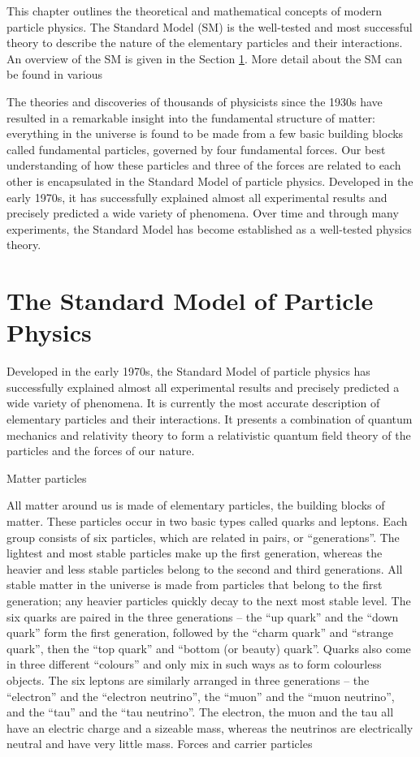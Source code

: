 This chapter outlines the theoretical and mathematical concepts of modern particle physics.
The Standard Model (SM) is the well-tested and most successful theory to describe the nature of the elementary particles and their interactions.
An overview of the SM is given in the Section \ref{sec: sm}.
More detail about the SM can be found in various 


The theories and discoveries of thousands of physicists since the 1930s have resulted in a remarkable insight into the fundamental structure of matter: everything in the universe is found to be made from a few basic building blocks called fundamental particles, governed by four fundamental forces. Our best understanding of how these particles and three of the forces are related to each other is encapsulated in the Standard Model of particle physics. Developed in the early 1970s, it has successfully explained almost all experimental results and precisely predicted a wide variety of phenomena. Over time and through many experiments, the Standard Model has become established as a well-tested physics theory.


\section{The Standard Model of Particle Physics} \label{sec: sm}
Developed in the early 1970s, the Standard Model of particle physics has successfully explained almost all experimental results and precisely predicted a wide variety of phenomena.
It is currently the most accurate description of elementary particles and their interactions.
It presents a combination of quantum mechanics and relativity theory to form a relativistic quantum field theory of the particles and the forces of our nature.






Matter particles

All matter around us is made of elementary particles, the building blocks of matter. These particles occur in two basic types called quarks and leptons. Each group consists of six particles, which are related in pairs, or “generations”. The lightest and most stable particles make up the first generation, whereas the heavier and less stable particles belong to the second and third generations. All stable matter in the universe is made from particles that belong to the first generation; any heavier particles quickly decay to the next most stable level. The six quarks are paired in the three generations – the “up quark” and the “down quark” form the first generation, followed by the “charm quark” and “strange quark”, then the “top quark” and “bottom (or beauty) quark”. Quarks also come in three different “colours” and only mix in such ways as to form colourless objects. The six leptons are similarly arranged in three generations – the “electron” and the “electron neutrino”, the “muon” and the “muon neutrino”, and the “tau” and the “tau neutrino”. The electron, the muon and the tau all have an electric charge and a sizeable mass, whereas the neutrinos are electrically neutral and have very little mass.
Forces and carrier particles

